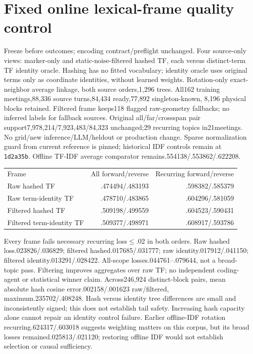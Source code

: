 \documentclass[11pt]{article}
\begin{document}
\section{Fixed online lexical-frame quality control}
Freeze  before outcomes;
encoding contract/preflight unchanged. Four source-only views: marker-only and
static-noise-filtered hashed TF, each versus distinct-term TF identity oracle.
Hashing has no fitted vocabulary\cite{sklearnfeaturehashing}; identity oracle
uses original terms only as coordinate identities, without learned weights.
Rotation-only exact-neighbor average linkage, both source orders,1,296 trees.
All162 training meetings,88,336 source turns,84,434 ready,77,892 singleton-known,
8,196 physical blocks retained. Filtered frame keeps118 flagged raw-geometry
fallbacks; no inferred labels for fallback sources. Original all/far/crossspan
pair support7,978,214/7,923,483/84,323 unchanged;29 recurring topics in21meetings.
No grid/new inference/LLM/heldout or production change. Sparse normalization
guard from current reference is pinned; historical IDF controls remain at
\texttt{1d2a35b}. Offline TF-IDF average comparator remains.554138/.553862/.622208.

\begin{center}\begin{tabular}{lrr}
Frame & All forward/reverse & Recurring forward/reverse \\
Raw hashed TF & .474494/.483193 & .598382/.585379 \\
Raw term-identity TF & .478710/.483865 & .604296/.581059 \\
Filtered hashed TF & .509198/.499559 & .604523/.590431 \\
Filtered term-identity TF & .509377/.498971 & .608917/.593786
\end{tabular}\end{center}
Every frame fails necessary recurring loss$\leq.02$ in both orders. Raw hashed
loss.023826/.036829; filtered hashed.017685/.031777; raw identity.017912/.041150;
filtered identity.013291/.028422. All-scope losses.044761--.079644, not a broad-topic
pass. Filtering improves aggregates over raw TF; no independent coding-agent or
statistical winner claim. Across246,924 distinct-block pairs, mean absolute hash
cosine error.002158/.001623 raw/filtered, maximum.235702/.408248. Hash versus
identity tree differences are small and inconsistently signed; this does not
establish tail safety. Increasing hash capacity alone cannot repair an identity
control failure. Earlier offline-IDF rotation recurring.624317/.603018 suggests
weighting matters on this corpus, but its broad losses remained.025813/.021120;
restoring offline IDF would not establish selection or causal sufficiency.
\end{document}
